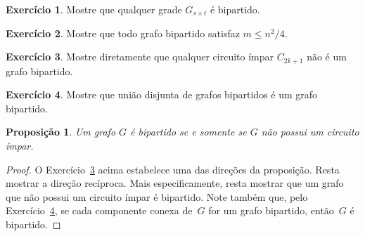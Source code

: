 \documentclass[12pt, a4paper]{article}
\newtheorem{prop}[teor]{Proposição}
\theoremstyle{definition}
\newtheorem{exer}{Exercício}
\begin{document}
\begin{exer}
Mostre que qualquer grade $G_{s \times t}$ é bipartido.
\end{exer}

\begin{exer}
Mostre que todo grafo bipartido satisfaz $m \leq n^2/4$.
\end{exer}

\begin{exer}
\label{exer:cimpar}
Mostre diretamente que qualquer circuito ímpar $C_{2k+1}$ não é um grafo bipartido.
\end{exer}

\begin{exer}
\label{exer:uni_bip}
Mostre que união disjunta de grafos bipartidos é um grafo bipartido.
\end{exer}

\begin{prop}
Um grafo $G$ é bipartido se e somente se $G$ não possui um circuito ímpar. 
\end{prop}

\begin{proof}
O Exercício~\ref{exer:cimpar} acima estabelece uma das direções da proposição. Resta mostrar a direção recíproca. Mais especificamente, resta mostrar que um grafo que não possui um circuito ímpar é bipartido. 
Note também que, pelo Exercício~\ref{exer:uni_bip}, se cada componente conexa de~$G$ for um grafo bipartido, então~$G$ é bipartido.
\end{proof}



\end{document}
